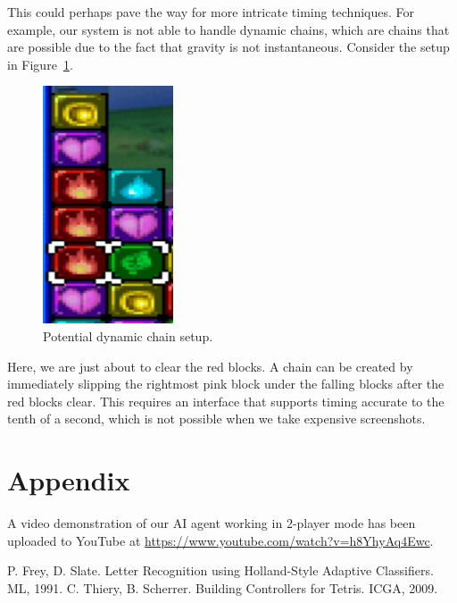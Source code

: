 \documentclass[12pt]{IEEEtran}
\begin{document}
This could perhaps pave the way for more intricate timing techniques. For example, our system is not able to handle dynamic chains, which are chains that are possible due to the fact that gravity is not instantaneous. Consider the setup in Figure~\ref{fig:dynamic}.
\begin{figure}[h!]
\centerline{\includegraphics[width=.8in]{dynamic.png}}
\caption{Potential dynamic chain setup.}
\label{fig:dynamic}
\end{figure}
Here, we are just about to clear the red blocks. A chain can be created by immediately slipping the rightmost pink block under the falling blocks after the red blocks clear. This requires an interface that supports timing accurate to the tenth of a second, which is not possible when we take expensive screenshots.

\section{Appendix}
A video demonstration of our AI agent working in $2$-player mode has been uploaded to YouTube at \href{https://www.youtube.com/watch?v=h8YhyAq4Ewc}{https://www.youtube.com/watch?v=h8YhyAq4Ewc}.

\begin{thebibliography}{1}
 P. Frey, D. Slate. Letter Recognition using Holland-Style Adaptive Classifiers. ML, 1991.
 C. Thiery, B. Scherrer. Building Controllers for Tetris. ICGA, 2009.
\end{thebibliography}
\end{document}
